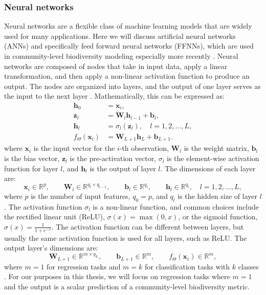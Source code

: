 \subsubsection{Neural networks}
Neural networks are a flexible class of machine learning models that are widely used for many applications. Here we will discuss artificial neural networks (ANNs) and specifically feed forward neural networks (FFNNs), which are used in community-level biodiversity modeling especially more recently \parencite{andermann2022, brugere2023, cai2023}. Neural networks are composed of nodes that take in input data, apply a linear transformation, and then apply a non-linear activation function to produce an output. The nodes are organized into layers, and the output of one layer serves as the input to the next layer \parencite{bishop_pattern_2006, smlbook}. Mathematically, this can be expressed as:
\begin{equation}\label{eq:neural-network}
\begin{aligned}
\mathbf{h}_0 &= \mathbf{x}_i, \\
\mathbf{z}_l &= \mathbf{W}_l\mathbf{h}_{l-1} + \mathbf{b}_l, \\
\mathbf{h}_{l} &= \sigma_l(\mathbf{z}_l),
\quad l = 1,2,\ldots,L, \\
f_\Theta(\mathbf{x}_i) &= \mathbf{W}_{L+1}\mathbf{h}_L + \mathbf{b}_{L+1}.
\end{aligned}
\end{equation}
where \(\mathbf{x}_i\) is the input vector for the \(i\)-th observation, \(\mathbf{W}_l\) is the weight matrix, \(\mathbf{b}_l\) is the bias vector, \(\mathbf{z}_l\) is the pre-activation vector, \(\sigma_l\) is the element-wise activation function for layer \(l\), and \(\mathbf{h}_l\) is the output of layer \(l\). The dimensions of each layer are:
\[\mathbf{x}_i \in \mathbb{R}^{p},
\qquad 
\mathbf{W}_l \in \mathbb{R}^{q_l \times q_{l-1}},
\qquad 
\mathbf{b}_l \in \mathbb{R}^{q_l},
\qquad
\mathbf{h}_l \in \mathbb{R}^{q_l},
\quad l = 1,2,\ldots,L, 
\]
where \(p\) is the number of input features, \(q_0 = p\), and \(q_l\) is the hidden size of layer \(l\). The activation function \(\sigma_l\) is a non-linear function, and common choices include the rectified linear unit (ReLU), \(\sigma(x) = \max(0, x)\), or the sigmoid function, \(\sigma(x) = \frac{1}{1 + e^{-x}}\). The activation function can be different between layers, but usually the same activation function is used for all layers, such as ReLU. The output layer's dimensions are: 
\[
\mathbf{W}_{L+1} \in \mathbb{R}^{m \times q_{L}},
\qquad 
\mathbf{b}_{L+1} \in \mathbb{R}^{m},
\qquad
f_\Theta(\mathbf{x}_i) \in \mathbb{R}^m,
\]
where \(m = 1\) for regression tasks and \(m = k\) for classification tasks with \(k\) classes \parencite{smlbook, prince2023understanding}. For our purposes in this thesis, we will focus on regression tasks where \(m=1\) and the output is a scalar prediction of a community-level biodiversity metric.

